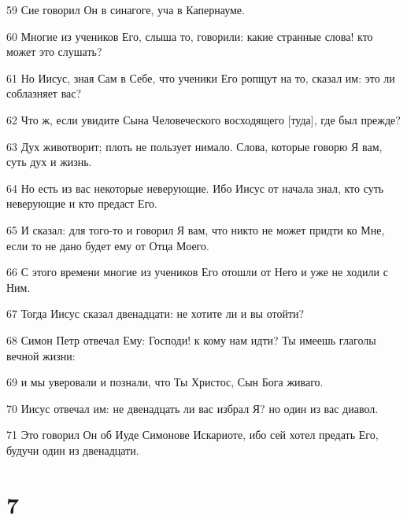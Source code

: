 \par 59 Сие говорил Он в синагоге, уча в Капернауме.
\par 60 Многие из учеников Его, слыша то, говорили: какие странные слова! кто может это слушать?
\par 61 Но Иисус, зная Сам в Себе, что ученики Его ропщут на то, сказал им: это ли соблазняет вас?
\par 62 Что ж, если увидите Сына Человеческого восходящего [туда], где был прежде?
\par 63 Дух животворит; плоть не пользует нимало. Слова, которые говорю Я вам, суть дух и жизнь.
\par 64 Но есть из вас некоторые неверующие. Ибо Иисус от начала знал, кто суть неверующие и кто предаст Его.
\par 65 И сказал: для того-то и говорил Я вам, что никто не может придти ко Мне, если то не дано будет ему от Отца Моего.
\par 66 С этого времени многие из учеников Его отошли от Него и уже не ходили с Ним.
\par 67 Тогда Иисус сказал двенадцати: не хотите ли и вы отойти?
\par 68 Симон Петр отвечал Ему: Господи! к кому нам идти? Ты имеешь глаголы вечной жизни:
\par 69 и мы уверовали и познали, что Ты Христос, Сын Бога живаго.
\par 70 Иисус отвечал им: не двенадцать ли вас избрал Я? но один из вас диавол.
\par 71 Это говорил Он об Иуде Симонове Искариоте, ибо сей хотел предать Его, будучи один из двенадцати.

\chapter{7}

